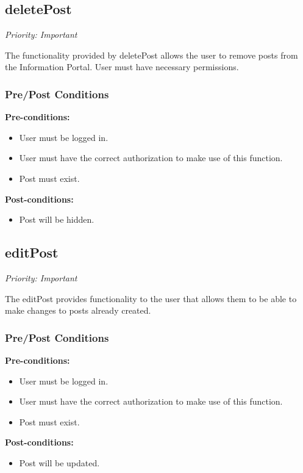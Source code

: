 \subsection{deletePost}
\textit{Priority: Important}

The functionality provided by deletePost allows the user to remove posts from the Information Portal. User must have necessary permissions.



\subsubsection{Pre/Post Conditions}
	\textbf{Pre-conditions:}
	\begin{itemize}
		\item User must be logged in.
		\item User must have the correct authorization to make use of this function.
		\item Post must exist.
	\end{itemize}
	\textbf{Post-conditions:}
	\begin{itemize}
		\item Post will be hidden.
	\end{itemize}

\subsection{editPost}
\textit{Priority: Important}

The editPost provides functionality to the user that allows them to be able to make changes to posts already created.



\subsubsection{Pre/Post Conditions}
	\textbf{Pre-conditions:}
	\begin{itemize}
		\item User must be logged in.
		\item User must have the correct authorization to make use of this function.
		\item Post must exist.
	\end{itemize}
	\textbf{Post-conditions:}
	\begin{itemize}
		\item Post will be updated.
	\end{itemize}